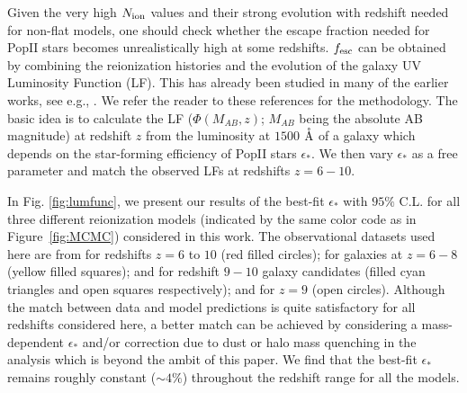 \documentclass[useAMS,usenatbib]{mnras}
\begin{document}
Given the very high $N_{\rm ion}$ values and their strong evolution with redshift needed for non-flat models,
one should check whether the escape fraction needed for PopII stars becomes unrealistically high at some redshifts.
$f_{\rm esc}$ can be obtained by combining the reionization histories and the evolution of the galaxy UV
Luminosity Function (LF). This has already been studied in many of the earlier works, see e.g.,
\cite{2007MNRAS.377..285S,2009MNRAS.398.2061S,2011MNRAS.412.2781K,mitra3,mitra4}. We refer the reader to
these references for the methodology. The basic idea is to calculate the LF ($\Phi(M_{AB}, z)$; $M_{AB}$ being
the absolute AB magnitude) at redshift $z$ from the luminosity at $1500$ $\mathring{\rm A}$ of a galaxy
which depends on the star-forming efficiency of PopII stars $\epsilon_*$. We then vary $\epsilon_*$ 
as a free parameter and match the observed LFs at redshifts $z=6-10$.

In Fig. \ref{fig:lumfunc}, we present our results of the best-fit $\epsilon_*$ with $95\%$ C.L. for all three
different reionization models (indicated by the same color code as in Figure~\ref{fig:MCMC})
considered in this work. The observational datasets used here are from \cite{2015ApJ...803...34B}
for redshifts $z=6$ to $10$ (red filled circles); \cite{2017ApJ...835..113L} for galaxies at $z=6-8$
(yellow filled squares); \cite{2014ApJ...786..108O} and \cite{2018ApJ...855..105O} for redshift $9-10$ galaxy
candidates (filled cyan triangles and open squares respectively); and \cite{2018ApJ...854...73I} for $z=9$
(open circles). Although the match between data and model predictions is quite satisfactory for all redshifts
considered here, a better match can be achieved by considering a mass-dependent $\epsilon_*$ and/or
correction due to dust or halo mass quenching \citep{2010ApJ...721..193P} in the analysis which is beyond the
ambit of this paper. We find that the best-fit $\epsilon_*$ remains roughly constant ($\sim4\%$) throughout the
redshift range for all the models.
\end{document}
